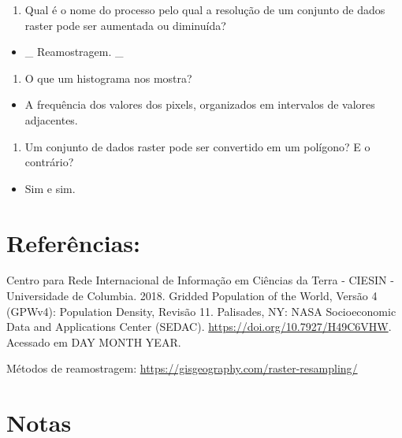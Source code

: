 \documentclass[
  portuguese,
]{krantz}
\providecommand{\tightlist}{%
  \setlength{\itemsep}{0pt}\setlength{\parskip}{0pt}}
\begin{document}
\begin{enumerate}
\def\labelenumi{\arabic{enumi}.}
\tightlist
\item
  Qual é o nome do processo pelo qual a resolução de um conjunto de dados raster pode ser aumentada ou diminuída?
\end{enumerate}

\begin{itemize}
\tightlist
\item
  \_ { Reamostragem. } \_
\end{itemize}

\begin{enumerate}
\def\labelenumi{\arabic{enumi}.}
\setcounter{enumi}{1}
\tightlist
\item
  O que um histograma nos mostra?
\end{enumerate}

\begin{itemize}
\tightlist
\item
  { A frequência dos valores dos pixels, organizados em intervalos de valores adjacentes. }
\end{itemize}

\begin{enumerate}
\def\labelenumi{\arabic{enumi}.}
\setcounter{enumi}{2}
\tightlist
\item
  Um conjunto de dados raster pode ser convertido em um polígono? E o contrário?
\end{enumerate}

\begin{itemize}
\tightlist
\item
  { Sim e sim. }
\end{itemize}

\hypertarget{referuxeancias}{%
\section{Referências:}\label{referuxeancias}}

Centro para Rede Internacional de Informação em Ciências da Terra - CIESIN - Universidade de Columbia. 2018. Gridded Population of the World, Versão 4 (GPWv4): Population Density, Revisão 11. Palisades, NY: NASA Socioeconomic Data and Applications Center (SEDAC). \url{https://doi.org/10.7927/H49C6VHW}. Acessado em DAY MONTH YEAR.

Métodos de reamostragem: \url{https://gisgeography.com/raster-resampling/}

\hypertarget{notas}{%
\section{Notas}\label{notas}}
\end{document}
